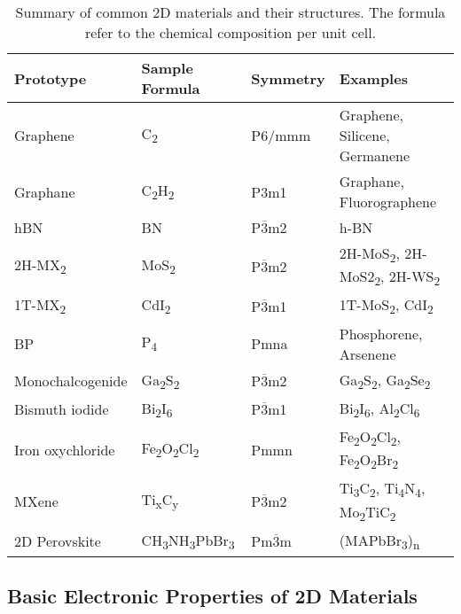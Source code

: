 \begin{table}[htbp]
  \centering
  \caption{Summary of common 2D materials and their structures. The
    formula refer to the chemical composition per unit cell.}
  \label{tab:category-2D}
  \begin{tabularx}{1.00\textwidth}{XXXX}
    \hline
    Prototype  & Sample Formula  & Symmetry & Examples \\
    \hline
    Graphene & C\textsubscript{2} &  P6/mmm & Graphene, Silicene, Germanene \\
    Graphane & C\textsubscript{2}H\textsubscript{2} &  P3m1 & Graphane, Fluorographene\\
    hBN      & BN                & P$\overline{3}$m2 & h-BN \\
    2H-MX\textsubscript{2} & MoS\textsubscript{2} & P$\overline{3}$m2 & 2H-MoS\textsubscript{2}, 2H-MoS2\textsubscript{2}, 2H-WS\textsubscript{2} \\
    1T-MX\textsubscript{2} & CdI\textsubscript{2} & P$\overline{3}$m1 & 1T-MoS\textsubscript{2}, CdI\textsubscript{2}\\
    BP & P\textsubscript{4} & Pmna & Phosphorene, Arsenene \\
    Mono\-chalcogenide & Ga\textsubscript{2}S\textsubscript{2} & P$\overline{3}$m2 & Ga\textsubscript{2}S\textsubscript{2}, Ga\textsubscript{2}Se\textsubscript{2} \\
    Bismuth iodide &  Bi\textsubscript{2}I\textsubscript{6} & P$\overline{3}$m1 & Bi\textsubscript{2}I\textsubscript{6}, Al\textsubscript{2}Cl\textsubscript{6} \\
    Iron oxychloride                &  Fe\textsubscript{2}O\textsubscript{2}Cl\textsubscript{2} & Pmmn & Fe\textsubscript{2}O\textsubscript{2}Cl\textsubscript{2}, Fe\textsubscript{2}O\textsubscript{2}Br\textsubscript{2}  \\
    MXene & Ti\textsubscript{x}C\textsubscript{y} & P$\overline{3}$m2 & Ti\textsubscript{3}C\textsubscript{2}, Ti\textsubscript{4}N\textsubscript{4}, Mo\textsubscript{2}TiC\textsubscript{2} \\
    2D Perovskite & CH\textsubscript{3}NH\textsubscript{3}PbBr\textsubscript{3} & Pm$\overline{3}$m & (MAPbBr\textsubscript{3})\textsubscript{n}\\
   \hline
\end{tabularx}
\end{table}

\subsection{Basic Electronic Properties of 2D Materials}
\label{sec:basic-electr-prop}

